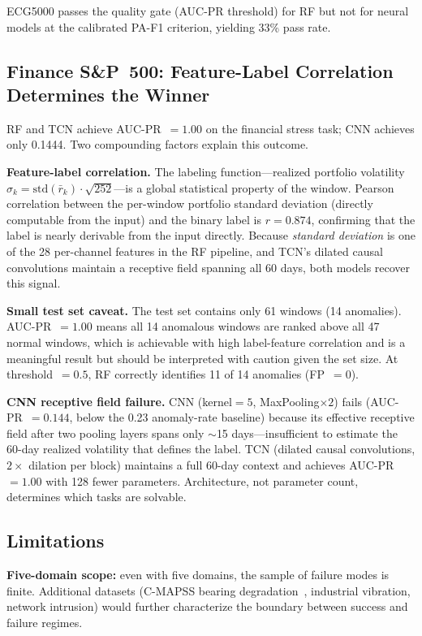 \documentclass[conference]{IEEEtran}
\begin{document}
ECG5000 passes the quality gate (AUC-PR threshold) for RF but not for neural
models at the calibrated PA-F1 criterion, yielding 33\% pass rate.

\subsection{Finance S\&P~500: Feature-Label Correlation Determines the Winner}

RF and TCN achieve AUC-PR~$=1.00$ on the financial stress task; CNN achieves
only 0.1444.
Two compounding factors explain this outcome.

\textbf{Feature-label correlation.}
The labeling function---realized portfolio volatility
$\hat{\sigma}_k = \text{std}(\bar{r}_k)\cdot\sqrt{252}$---is a global
statistical property of the window.
Pearson correlation between the per-window portfolio standard deviation
(directly computable from the input) and the binary label is $r=0.874$,
confirming that the label is nearly derivable from the input directly.
Because \emph{standard deviation} is one of the 28 per-channel features
in the RF pipeline, and TCN's dilated causal convolutions maintain a
receptive field spanning all 60 days, both models recover this signal.

\textbf{Small test set caveat.}
The test set contains only 61 windows (14 anomalies).
AUC-PR~$=1.00$ means all 14 anomalous windows are ranked above all 47 normal
windows, which is achievable with high label-feature correlation and is a
meaningful result but should be interpreted with caution given the set size.
At threshold~$=0.5$, RF correctly identifies 11 of 14 anomalies (FP~$=0$).

\textbf{CNN receptive field failure.}
CNN (kernel$=5$, MaxPooling$\times2$) fails (AUC-PR~$=0.144$, below
the 0.23 anomaly-rate baseline) because its effective receptive field after
two pooling layers spans only $\sim$15 days---insufficient to estimate the
60-day realized volatility that defines the label.
TCN (dilated causal convolutions, $2\times$ dilation per block) maintains
a full 60-day context and achieves AUC-PR~$=1.00$ with 128 fewer parameters.
Architecture, not parameter count, determines which tasks are solvable.

\subsection{Limitations}

\textbf{Five-domain scope:} even with five domains, the sample of failure modes
is finite.
Additional datasets (C-MAPSS bearing degradation~\cite{saxena2008damage},
industrial vibration, network intrusion) would further characterize the boundary
between success and failure regimes.
\end{document}
